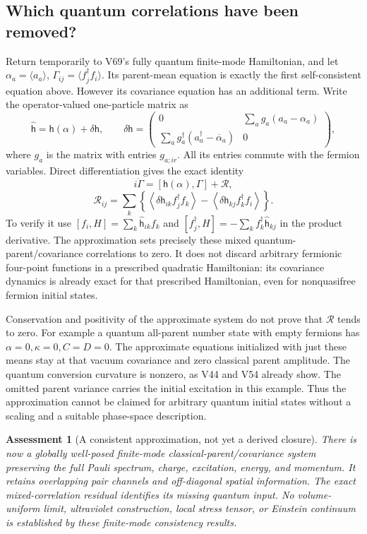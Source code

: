 \documentclass[11pt]{article}
\newtheorem{assessment}[theorem]{Assessment}
\theoremstyle{remark}
\begin{document}
\subsection{Which quantum correlations have been removed?}

Return temporarily to V69's fully quantum finite-mode
Hamiltonian, and let \(\alpha_a=\langle a_a\rangle\),
\(\Gamma_{ij}=\langle f_j^\dagger f_i\rangle\).
Its parent-mean equation is exactly the first
self-consistent equation above.  However its covariance
equation has an additional term.
Write the operator-valued one-particle matrix as
\[
 \widehat{\mathsf h}=\mathsf h(\alpha)+\delta\mathsf h,\qquad
 \delta\mathsf h=
 \begin{pmatrix}
 0&\sum_a g_a(a_a-\alpha_a)\\
 \sum_a g_a^\dagger(a_a^\dagger-\overline\alpha_a)&0
 \end{pmatrix},
\]
where \(g_a\) is the matrix with entries \(g_{a;ir}\).
All its entries commute with the fermion variables.
Direct differentiation gives the exact identity
\[
 i\dot\Gamma=[\mathsf h(\alpha),\Gamma]+\mathcal R,
\]
\[
 \mathcal R_{ij}=
 \sum_k\left\{
 \left\langle\delta\mathsf h_{ik} f_j^\dagger f_k\right\rangle
 -\left\langle\delta\mathsf h_{kj} f_k^\dagger f_i\right\rangle
 \right\}.
\]
To verify it use
\([f_i,H]=\sum_k\widehat{\mathsf h}_{ik}f_k\)
and
\([f_j^\dagger,H]=-\sum_k f_k^\dagger\widehat{\mathsf h}_{kj}\)
in the product derivative.
The approximation sets precisely these mixed
quantum-parent/covariance correlations to zero.
It does not discard arbitrary fermionic four-point
functions in a prescribed quadratic Hamiltonian:
its covariance dynamics is already exact for that
prescribed Hamiltonian, even for nonquasifree
fermion initial states.

Conservation and positivity of the approximate
system do not prove that \(\mathcal R\) tends to zero.
For example a quantum all-parent number state with
empty fermions has \(\alpha=0,\kappa=0,C=D=0\).
The approximate equations initialized with just
these means stay at that vacuum covariance and
zero classical parent amplitude.  The quantum
conversion curvature is nonzero, as V44 and V54
already show.  The omitted parent variance carries
the initial excitation in this example.
Thus the approximation cannot be claimed for
arbitrary quantum initial states without a scaling
and a suitable phase-space description.

\begin{assessment}[A consistent approximation, not yet a derived closure]
\label{ass:v20v71}
There is now a globally well-posed finite-mode
classical-parent/covariance system preserving
the full Pauli spectrum, charge, excitation,
energy, and momentum.  It retains overlapping
pair channels and off-diagonal spatial information.
The exact mixed-correlation residual identifies
its missing quantum input.  No volume-uniform
limit, ultraviolet construction, local stress
tensor, or Einstein continuum is established by
these finite-mode consistency results.
\end{assessment}
\end{document}
